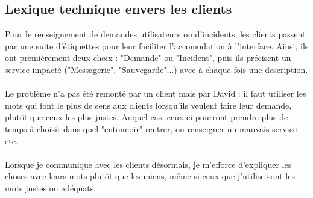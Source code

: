 \subsection{Lexique technique envers les clients}

Pour le renseignement de demandes utilisateurs ou d'incidents, les clients passent par une suite d'étiquettes pour leur faciliter l'accomodation à l'interface. Ainsi, ils ont premièrement deux choix : "Demande" ou "Incident", puis ils précisent un service impacté ("Messagerie", "Sauvegarde"...) avec à chaque fois une description.
\\ \\
Le problème n'a pas été remonté par un client mais par David : il faut utiliser les mots qui font le plus de sens aux clients lorsqu'ils veulent faire leur demande, plutôt que ceux les plus justes. Auquel cas, ceux-ci pourront prendre plus de temps à choisir dans quel "entonnoir" rentrer, ou renseigner un mauvais service etc.
\\ \\
Lorsque je communique avec les clients désormais, je m'efforce d'expliquer les choses avec leurs mots plutôt que les miens, même si ceux que j'utilise sont les mots justes ou adéquats.

